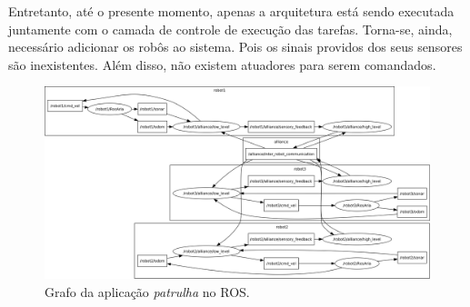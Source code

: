             Entretanto, até o presente momento, apenas a arquitetura está sendo executada juntamente com o camada de controle de execução das tarefas. Torna-se, ainda, necessário adicionar os robôs ao sistema. Pois os sinais providos dos seus sensores são inexistentes. Além disso, não existem atuadores para serem comandados.
        
            \begin{figure}[p]
                \centering
                \includegraphics[width=.97\textheight,angle=90]{Figuras/4_resultados/patrulha_rosgraph.png}
                \caption{Grafo da aplicação \textit{patrulha} no ROS.} \label{fig:patrulha_rosgraph}
            \end{figure}
        
    
        